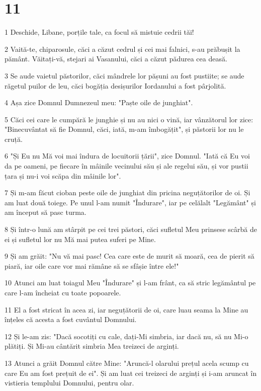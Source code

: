 \chapter{11}

\par 1 Deschide, Libane, porțile tale, ca focul să mistuie cedrii tăi!
\par 2 Vaită-te, chiparosule, căci a căzut cedrul și cei mai falnici, s-au prăbușit la pământ. Văitați-vă, stejari ai Vasanului, căci a căzut pădurea cea deasă.
\par 3 Se aude vaietul păstorilor, căci mândrele lor pășuni au fost pustiite; se aude răgetul puilor de leu, căci bogăția desișurilor Iordanului a fost pârjolită.
\par 4 Așa zice Domnul Dumnezeul meu: "Paște oile de junghiat".
\par 5 Căci cei care le cumpără le junghie și nu au nici o vină, iar vânzătorul lor zice: "Binecuvântat să fie Domnul, căci, iată, m-am îmbogățit", și păstorii lor nu le cruță.
\par 6 "Și Eu nu Mă voi mai îndura de locuitorii țării", zice Domnul. "Iată că Eu voi da pe oameni, pe fiecare în mâinile vecinului său și ale regelui său, și vor pustii țara și nu-i voi scăpa din mâinile lor".
\par 7 Și m-am făcut cioban peste oile de junghiat din pricina neguțătorilor de oi. Și am luat două toiege. Pe unul l-am numit "Îndurare", iar pe celălalt "Legământ" și am început să pasc turma.
\par 8 Și într-o lună am stârpit pe cei trei păstori, căci sufletul Meu prinsese scârbă de ei și sufletul lor nu Mă mai putea suferi pe Mine.
\par 9 Și am grăit: "Nu vă mai pasc! Cea care este de murit să moară, cea de pierit să piară, iar oile care vor mai rămâne să se sfâșie între ele!"
\par 10 Atunci am luat toiagul Meu "Îndurare" și l-am frânt, ca să stric legământul pe care l-am încheiat cu toate popoarele.
\par 11 El a fost stricat în acea zi, iar neguțătorii de oi, care luau seama la Mine au înțeles că acesta a fost cuvântul Domnului.
\par 12 Și le-am zis: "Dacă socotiți cu cale, dați-Mi simbria, iar dacă nu, să nu Mi-o plătiți. Și Mi-au cântărit simbria Mea treizeci de arginți.
\par 13 Atunci a grăit Domnul către Mine: "Aruncă-l olarului prețul acela scump cu care Eu am fost prețuit de ei". Și am luat cei treizeci de arginți și i-am aruncat în vistieria templului Domnului, pentru olar.
